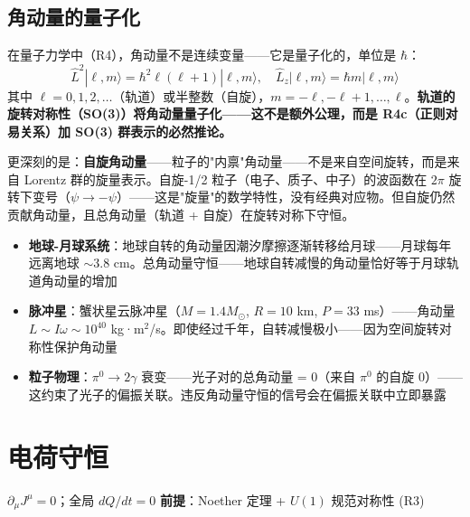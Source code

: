 
\subsection{角动量的量子化}

在量子力学中（R4），角动量不是连续变量——它是量子化的，单位是 $\hbar$：
\[
\hat{L}^2| \ell, m\rangle = \hbar^2\ell(\ell+1)| \ell, m\rangle, \quad \hat{L}_z| \ell, m\rangle = \hbar m| \ell, m\rangle
\]
其中 $\ell = 0, 1, 2, \ldots$（轨道）或半整数（自旋），$m = -\ell, -\ell+1, \ldots, \ell$。\textbf{轨道的旋转对称性（SO(3)）将角动量量子化——这不是额外公理，而是 R4c（正则对易关系）加 SO(3) 群表示的必然推论。}

更深刻的是：\textbf{自旋角动量}——粒子的"内禀"角动量——不是来自空间旋转，而是来自 Lorentz 群的旋量表示。自旋-1/2 粒子（电子、质子、中子）的波函数在 $2\pi$ 旋转下变号（$\psi \to -\psi$）——这是"旋量"的数学特性，没有经典对应物。但自旋仍然贡献角动量，且总角动量（轨道 + 自旋）在旋转对称下守恒。

\begin{oombox}[角动量守恒的数量级]
  \begin{itemize}
    \item \textbf{地球-月球系统}：地球自转的角动量因潮汐摩擦逐渐转移给月球——月球每年远离地球 $\sim 3.8$ cm。总角动量守恒——地球自转减慢的角动量恰好等于月球轨道角动量的增加
    \item \textbf{脉冲星}：蟹状星云脉冲星（$M=1.4 M_\odot$, $R=10$ km, $P=33$ ms）——角动量 $L \sim I\omega \sim 10^{40}$ kg·m$^2$/s。即使经过千年，自转减慢极小——因为空间旋转对称性保护角动量
    \item \textbf{粒子物理}：$\pi^0 \to 2\gamma$ 衰变——光子对的总角动量 = 0（来自 $\pi^0$ 的自旋 0）——这约束了光子的偏振关联。违反角动量守恒的信号会在偏振关联中立即暴露
  \end{itemize}
\end{oombox}

\section{电荷守恒}

\begin{lawbox}[电荷守恒]
  $\partial_\mu J^\mu = 0$；全局 $dQ/dt = 0$
  \quad\textbf{前提}：Noether 定理 + $U(1)$ 规范对称性 (R3)
\end{lawbox}

